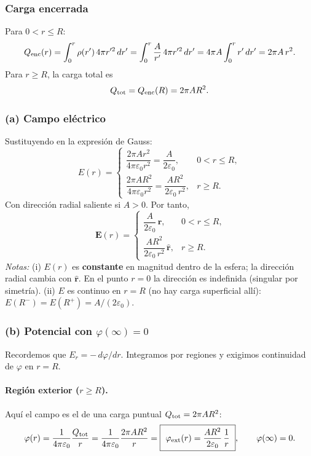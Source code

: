 \documentclass{article}
\begin{document}
\subsubsection*{Carga encerrada}
Para $0<r\le R$:
\[
Q_{\rm enc}(r)=\int_{0}^{r}\rho(r')\,4\pi r'^2\,dr'=\int_0^{r}\frac{A}{r'}\,4\pi r'^2\,dr'
=4\pi A\int_0^{r} r'\,dr'=2\pi A\,r^2.
\]
Para $r\ge R$, la carga total es
\[
Q_{\rm tot}=Q_{\rm enc}(R)=2\pi A R^2.
\]

\subsubsection*{(a) Campo eléctrico}
Sustituyendo en la expresión de Gauss:
\[
E(r)=
\begin{cases}
\dfrac{2\pi A r^2}{4\pi\varepsilon_0 r^2}=\dfrac{A}{2\varepsilon_0}, & 0< r\le R,\\[10pt]
\dfrac{2\pi A R^2}{4\pi\varepsilon_0 r^2}=\dfrac{A R^2}{2\varepsilon_0\,r^2}, & r\ge R.
\end{cases}
\]
Con dirección radial saliente si $A>0$. Por tanto,
\[
\boxed{\ 
\mathbf E(r)=
\begin{cases}
\dfrac{A}{2\varepsilon_0}\,\hat{\mathbf r}, & 0< r\le R,\\[8pt]
\dfrac{A R^2}{2\varepsilon_0\,r^2}\,\hat{\mathbf r}, & r\ge R.
\end{cases}}
\]
\textit{Notas:} (i) $E(r)$ es \textbf{constante} en magnitud dentro de la esfera; la dirección radia\!l cambia con $\hat{\mathbf r}$. En el punto $r=0$ la dirección es indefinida (singular por simetría).  
(ii) $E$ es continuo en $r=R$ (no hay carga superficial allí): $E(R^-)=E(R^+)=A/(2\varepsilon_0)$.

\subsubsection*{(b) Potencial con $\varphi(\infty)=0$}
Recordemos que $E_r=-\,d\varphi/dr$. Integramos por regiones y exigimos continuidad de $\varphi$ en $r=R$.

\paragraph{Región exterior ($r\ge R$).}
Aquí el campo es el de una carga puntual $Q_{\rm tot}=2\pi A R^2$:
\[
\varphi(r)=\frac{1}{4\pi\varepsilon_0}\frac{Q_{\rm tot}}{r}
=\frac{1}{4\pi\varepsilon_0}\frac{2\pi A R^2}{r}
=\boxed{\ \varphi_{\text{ext}}(r)=\frac{A R^2}{2\varepsilon_0}\,\frac{1}{r}\ },\qquad \varphi(\infty)=0.
\]
\end{document}
